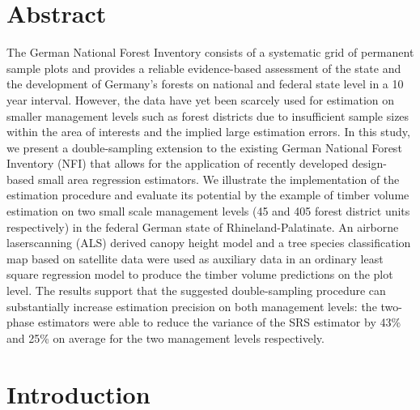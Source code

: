 \section*{Abstract}
\label{chap:sae:Abstract}
The German National Forest Inventory consists of a systematic grid of permanent sample plots and provides a reliable evidence-based assessment of the state and the development of Germany's forests on national and federal state level in a 10 year interval. However, the data have yet been scarcely used for estimation on smaller management levels such as forest districts due to insufficient sample sizes within the area of interests and the implied large estimation errors. In this study, we present a double-sampling extension to the existing German National Forest Inventory (NFI) that allows for the application of recently developed design-based small area regression estimators. We illustrate the implementation of the estimation procedure and evaluate its potential by the example of timber volume estimation on two small scale management levels (45 and 405 forest district units respectively) in the federal German state of Rhineland-Palatinate. An airborne laserscanning (ALS) derived canopy height model and a tree species classification map based on satellite data were used as auxiliary data in an ordinary least square regression model to produce the timber volume predictions on the plot level.
The results support that the suggested double-sampling procedure can substantially increase estimation precision on both management levels: the two-phase estimators were able to reduce the variance of the SRS estimator by 43\% and 25\% on average for the two management levels respectively.



\section{Introduction}
\label{sec:intro}

